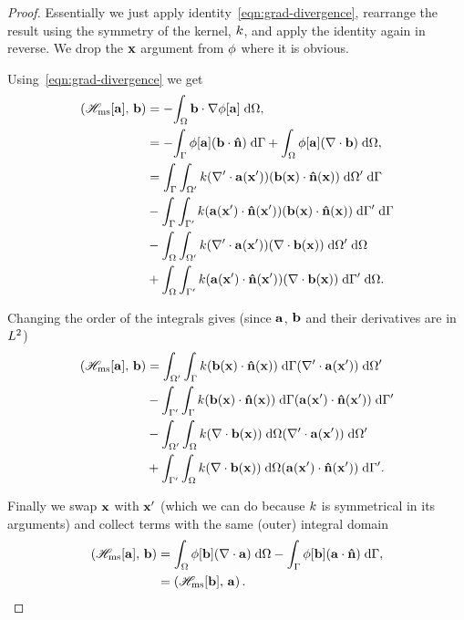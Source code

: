 \begin{proof}

  Essentially we just apply identity~\cref{eqn:grad-divergence}, rearrange the result using the symmetry of the kernel, $\knl$, and apply the identity again in reverse. We drop the $\xv$ argument from $\phim$ where it is obvious.

  Using~\cref{eqn:grad-divergence} we get
  \begin{equation}
    \begin{aligned}
      \ip{\hmsop[\av]}{\bv} &= -\intd{\bv \cdot \grad \phim[\av] }, \\
      &= - \intb{\phim[\av] (\bv \cdot \nv)} + \intd{\phim[\av] (\div \bv) }, \\
      &= \intb{ \intd[\magd']{\knl (\nabla' \cdot \av(\xv')) (\bv(\xv) \cdot \nv(\xv))}} \\
      &- \intb{ \intd[\boundd']{\knl (\av(\xv') \cdot \nv(\xv')) (\bv(\xv) \cdot \nv(\xv))}} \\
      &- \intd{ \intd[\magd']{\knl (\nabla' \cdot \av(\xv')) (\div \bv(\xv))}} \\
      &+ \intd{ \intd[\boundd']{\knl (\av(\xv') \cdot \nv(\xv')) (\div \bv(\xv))}}.
    \end{aligned}
  \end{equation}

Changing the order of the integrals gives (since $\av$, $\bv$ and their derivatives are in $\ltwo$)
  \begin{equation}
    \begin{aligned}
      \ip{\hmsop[\av]}{\bv}
      &= \intd[\magd']{ \intb{\knl (\bv(\xv) \cdot \nv(\xv))} (\nabla' \cdot \av(\xv'))} \\
      &- \intd[\boundd']{ \intb{\knl (\bv(\xv) \cdot \nv(\xv))} (\av(\xv') \cdot \nv(\xv'))} \\
      &- \intd[\magd']{ \intd{\knl (\div \bv(\xv))} (\nabla' \cdot \av(\xv'))} \\
      &+ \intd[\boundd']{ \intd{\knl (\div \bv(\xv))} (\av(\xv') \cdot \nv(\xv'))}.
    \end{aligned}
  \end{equation}

  Finally we swap $\xv$ with $\xv'$ (which we can do because $\knl$ is symmetrical in its arguments) and collect terms with the same (outer) integral domain
  \begin{equation}
    \begin{aligned}
      \ip{\hmsop[\av]}{\bv} &= \intd{\phi[\bv] (\div \av)} - \intb{\phi[\bv] (\av \cdot \nv)}, \\
      & = \ip{\hmsop[\bv]}{\av}.
    \end{aligned}
  \end{equation}

\end{proof}

